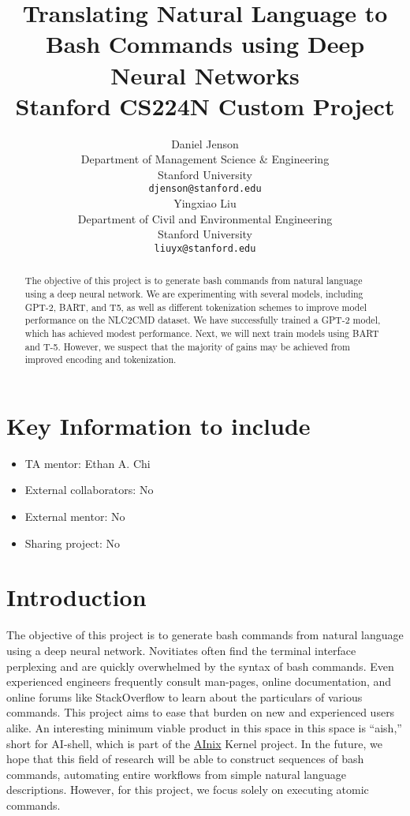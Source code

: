 \documentclass{article}
\title{
  Translating Natural Language to Bash Commands using Deep Neural Networks \\
  \vspace{1em}
  \small{\normalfont Stanford CS224N Custom Project}
}
\author{
 Daniel Jenson \\
  Department of Management Science \& Engineering \\
  Stanford University \\
  \texttt{djenson@stanford.edu} \\
  \And
  Yingxiao Liu \\
  Department of Civil and Environmental Engineering \\
  Stanford University \\
  \texttt{liuyx@stanford.edu} \\
}
\begin{document}
\maketitle

\begin{abstract}
	The objective of this project is to generate bash commands from natural
	language using a deep neural network. We are experimenting with several models,
	including GPT-2, BART, and T5, as well as different tokenization schemes to
	improve model performance on the NLC2CMD dataset. We have successfully
	trained a GPT-2 model, which has achieved modest performance. Next, we will
	next train models using BART and T-5. However, we suspect that the majority
	of gains may be achieved from improved encoding and tokenization.
\end{abstract}


\section{Key Information to include}
\begin{itemize}
	\item TA mentor: Ethan A. Chi
	\item External collaborators: No
	\item External mentor: No
	\item Sharing project: No
\end{itemize}


\section{Introduction}
The objective of this project is to generate bash commands from natural
language using a deep neural network. Novitiates often find the terminal
interface perplexing and are quickly overwhelmed by the syntax of bash
commands. Even experienced engineers frequently consult man-pages, online
documentation, and online forums like StackOverflow to learn about the
particulars of various commands. This project aims to ease that burden on new
and experienced users alike. An interesting minimum viable product in this
space in this space is ``aish,'' short for AI-shell, which is part of the
\href{http://anix.org}{AInix} Kernel project. In the future, we hope that this
field of research will be able to construct sequences of bash commands,
automating entire workflows from simple natural language descriptions. However,
for this project, we focus solely on executing atomic commands.
\end{document}
